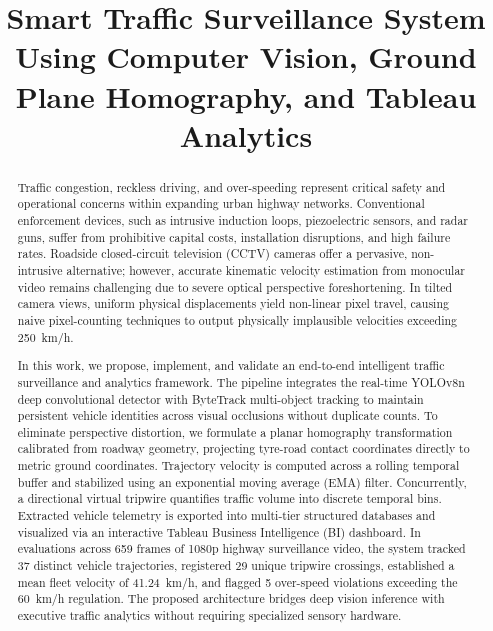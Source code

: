 \documentclass[conference]{IEEEtran}
\begin{document}
\title{Smart Traffic Surveillance System Using Computer Vision, Ground Plane Homography, and Tableau Analytics}

\author{
}

\maketitle

\begin{abstract}
Traffic congestion, reckless driving, and over-speeding represent critical safety and operational concerns within expanding urban highway networks. Conventional enforcement devices, such as intrusive induction loops, piezoelectric sensors, and radar guns, suffer from prohibitive capital costs, installation disruptions, and high failure rates. Roadside closed-circuit television (CCTV) cameras offer a pervasive, non-intrusive alternative; however, accurate kinematic velocity estimation from monocular video remains challenging due to severe optical perspective foreshortening. In tilted camera views, uniform physical displacements yield non-linear pixel travel, causing naive pixel-counting techniques to output physically implausible velocities exceeding 250~km/h.

In this work, we propose, implement, and validate an end-to-end intelligent traffic surveillance and analytics framework. The pipeline integrates the real-time YOLOv8n deep convolutional detector with ByteTrack multi-object tracking to maintain persistent vehicle identities across visual occlusions without duplicate counts. To eliminate perspective distortion, we formulate a planar homography transformation calibrated from roadway geometry, projecting tyre-road contact coordinates directly to metric ground coordinates. Trajectory velocity is computed across a rolling temporal buffer and stabilized using an exponential moving average (EMA) filter. Concurrently, a directional virtual tripwire quantifies traffic volume into discrete temporal bins. Extracted vehicle telemetry is exported into multi-tier structured databases and visualized via an interactive Tableau Business Intelligence (BI) dashboard. In evaluations across 659 frames of 1080p highway surveillance video, the system tracked 37 distinct vehicle trajectories, registered 29 unique tripwire crossings, established a mean fleet velocity of 41.24~km/h, and flagged 5 over-speed violations exceeding the 60~km/h regulation. The proposed architecture bridges deep vision inference with executive traffic analytics without requiring specialized sensory hardware.
\end{abstract}
\end{document}
